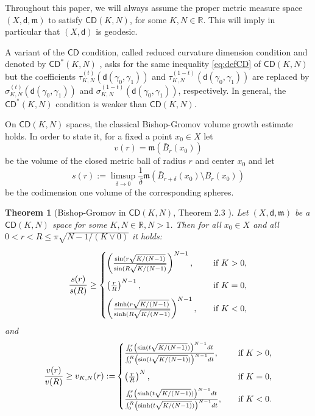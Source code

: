 \documentclass[a4paper]{amsart}
\newcounter{assu}
\theoremstyle{plain}
\newtheorem{theorem}[lemma]{Theorem}
\theoremstyle{definition}
\numberwithin{equation}{section}
\newcommand{\R}{\mathbb{R}}
\newcommand{\CD}{\mathsf{CD}}
\newcommand{\mm}{\mathfrak m}
\newcommand{\sfd}{\mathsf d}
\begin{document}
{{Throughout this paper, we will always assume the proper metric measure space $(X,\sfd,\mm)$ to satisfy $\CD(K,N)$, for some $K,N \in \R$. This will imply in particular that $(X,\sfd)$ is geodesic.

A variant of the $\CD$ condition, called  reduced curvature dimension condition and denoted by  $\CD^{*}(K,N)$ \cite{BS10},  asks for the same inequality \eqref{eq:defCD} of $\CD(K,N)$ but  the
coefficients $\tau_{K,N}^{(t)}(\sfd(\gamma_{0},\gamma_{1}))$ and $\tau_{K,N}^{(1-t)}(\sfd(\gamma_{0},\gamma_{1}))$ 
are replaced by $\sigma_{K,N}^{(t)}(\sfd(\gamma_{0},\gamma_{1}))$ and $\sigma_{K,N}^{(1-t)}(\sfd(\gamma_{0},\gamma_{1}))$, respectively.
In general, the $\CD^{*}(K,N)$ condition is weaker than  $\CD(K,N)$. 
\medskip

On $\CD(K,N)$ spaces,  the  classical Bishop-Gromov volume growth estimate holds. In order to state it, for a  fixed a point $x_{0}\in X$ let 
$$ v(r)= \mm(\bar{B}_{r}(x_{0})) $$
be the volume of the closed metric ball of radius $r$ and center $x_{0}$ and let 
$$
s(r):=\limsup_{\delta\to 0} \frac{1}{\delta} \mm(\bar{B}_{r+\delta}(x_{0}) \setminus  B_{r}(x_{0}))
$$
be the codimension one volume of the corresponding spheres.

\begin{theorem}[Bishop-Gromov in $\CD(K,N)$, Theorem 2.3 \cite{sturm:II}]\label{thm:BishopGromov}
Let $(X,\sfd,\mm)$ be a  $\CD(K,N)$ space for some $K,N\in \R, N> 1$. Then for all $x_{0}\in X$ and all $0< r< R\leq \pi \sqrt{N-1/(K \vee 0)}$ it holds:

\begin{equation}\label{eq:BSspheres}
\frac{s(r)}{s(R)} \geq 
\begin{cases}
\left( \frac{\sin(r \sqrt{K/(N-1)}}{ \sin(R \sqrt{K/(N-1)} }  \right)^{N-1},& \quad \text{if } K>0,\medskip \\
\left( \frac r  R  \right)^{N-1},& \quad \text{if } K=0, \medskip \\
\left( \frac{\sinh(r \sqrt{K/(N-1)}}{ \sinh(R \sqrt{K/(N-1)} }  \right)^{N-1},& \quad \text{if } K<0,
\end{cases}
\end{equation}
and 
\begin{equation}\label{eq:BSballs}
\frac{v(r)}{v(R)} \geq { v_{K,N}(r):=}
\begin{cases}
\frac{\int_{0}^{r} \left(\sin(t \sqrt{K/(N-1)})\right)^{N-1} dt}{ \int_{0}^{R} \left(\sin(t \sqrt{K/(N-1)}) \right)^{N-1} dt} ,& \quad \text{if } K>0, \medskip \\
\left(\frac r  R  \right)^{N},& \quad \text{if } K=0, \medskip \\
\frac{\int_{0}^{r} \left(\sinh(t \sqrt{K/(N-1)})\right)^{N-1} dt}{ \int_{0}^{R} \left(\sinh(t \sqrt{K/(N-1)}) \right)^{N-1} dt} ,& \quad \text{if } K<0. 
\end{cases}
\end{equation}





\end{theorem}}}
\end{document}
